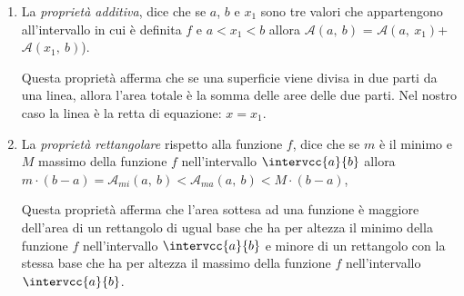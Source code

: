 \begin{enumerate}
 \item
 
La \emph{proprietà additiva}, dice che se \(a\), \(b\) e \(x_1\) 
sono tre valori che appartengono all'intervallo in cui è definita \(f\) e 
\(a < x_1 < b\)
allora \(\mathcal{A}(a,~b)\) = 
\(\mathcal{A}(a,~x_1)\)+\(\mathcal{A}(x_1,~b)\)).

\begin{minipage}{.49\textwidth}
\begin{inaccessibleblock} 
  \areasottesacurva
\end{inaccessibleblock}
\end{minipage}
\hfill
\begin{minipage}{.49\textwidth}
  \propradditiva
\end{minipage}

Questa proprietà afferma che se una superficie 
viene divisa in due parti da una linea, 
allora l'area totale è la somma delle aree delle due parti.
Nel nostro caso la linea è la retta di equazione: \(x = x_1\).

 \item  

La \emph{proprietà rettangolare} rispetto alla funzione \(f\), 
dice che se \(m\) è il minimo e \(M\) massimo della funzione \(f\) 
nell'intervallo \(\intervcc{a}{b}\)
allora \\
\(m\cdot(b-a) = \mathcal{A}_{mi}(a,~b) < 
                       \mathcal{A}_{ma}(a,~b) < M\cdot(b-a)\),

\begin{minipage}{.49\textwidth}
\begin{inaccessibleblock} 
  \areaminore
\end{inaccessibleblock}
\end{minipage}
\hfill
\begin{minipage}{.49\textwidth}
\begin{inaccessibleblock} 
  \areamaggiore
\end{inaccessibleblock}
\end{minipage}

Questa proprietà afferma che l'area sottesa ad una funzione è maggiore 
dell'area di un rettangolo di ugual base che ha per altezza il minimo della 
funzione \(f\) nell'intervallo \(\intervcc{a}{b}\) 
e minore di un rettangolo con la stessa base che ha per altezza il massimo 
della funzione \(f\) nell'intervallo \(\intervcc{a}{b}\). 
\end{enumerate}

